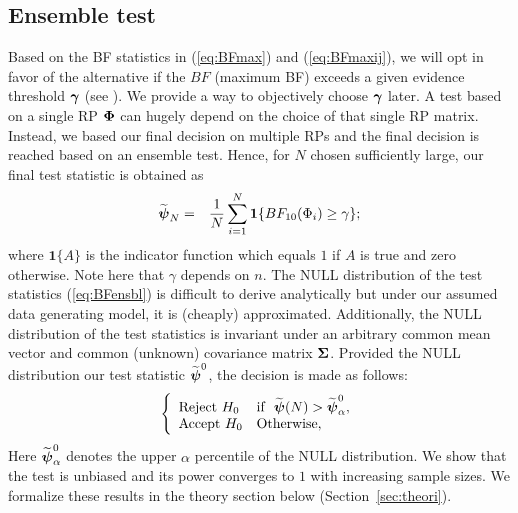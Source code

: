 \documentclass[12pt]{article}
\def\be{\begin{eqnarray}}
\def\ee{\end{eqnarray}}
\def\boldpsi{{\mbox{\boldmath $\psi$}}}
\def\trans{^{\rm T}}
\def\bone{{\mathbf 1}}
\newcommand{\uI}       {\mbox{\boldmath$I$}}
\newcommand{\uS}       {\mbox{\boldmath$S$}}
\newcommand{\ugamma}            {\mbox{\boldmath$\gamma$}}
\newcommand{\uSigma}            {\mbox{\boldmath$\Sigma$}}
\newcommand{\uPhi}              {\mbox{\boldmath$\Phi$}}
\begin{document}

\subsection{Ensemble test} \label{sec:testens}
Based on the BF statistics in (\ref{eq:BFmax}) and (\ref{eq:BFmaxij}), we will opt in favor of the alternative if the $BF$ (maximum BF) exceeds a given evidence threshold $\ugamma$  (see \citealp{kass1995bayes}). We provide a way to objectively choose $\ugamma$ later. A test based on a single RP $\uPhi$ can hugely depend on the choice of that single RP matrix. Instead, we based our final decision on multiple RPs and the final decision is reached based on an ensemble test. Hence, for $N$ chosen sufficiently large, our final test statistic is obtained as
\be
\widetilde{\boldpsi}_{N} &=& \frac{1}{N}\sum^{N}_{i=1} \bone\{ BF_{10}(\Phi_i) \geq \gamma\}; \label{eq:BFensbl}
\ee
where $\bone\{A\}$ is the indicator function which equals $1$ if $A$ is true and zero otherwise. Note here that $\gamma$ depends on $n$. The NULL distribution of the test statistics (\ref{eq:BFensbl}) is difficult to derive analytically but under our assumed data generating model, it is (cheaply) approximated. Additionally, the NULL distribution of the test statistics is invariant under an arbitrary common mean vector and common (unknown) covariance matrix $\uSigma$. Provided the NULL distribution our test statistic $\widetilde{\boldpsi}^{0}$, the decision is made as follows:
\be
 \left \{
       \begin{array}{llll}
       \mbox{Reject}~ H_{0} & \mbox{if} ~~ \widetilde{\boldpsi}(N) > \widetilde{\boldpsi}^{0}_{\alpha},  \\
       \mbox{Accept}~ H_{0} & \mbox{Otherwise}, \label{eq:eqBFfin}
       \end{array}
       \right.
\ee
Here $\widetilde{\boldpsi}^{0}_{\alpha}$ denotes the upper $\alpha$ percentile of the NULL distribution.  
We show that the test is unbiased and its power converges to $1$ with increasing sample sizes. We formalize these results in the theory section below (Section~\ref{sec:theori}).  
\end{document}
